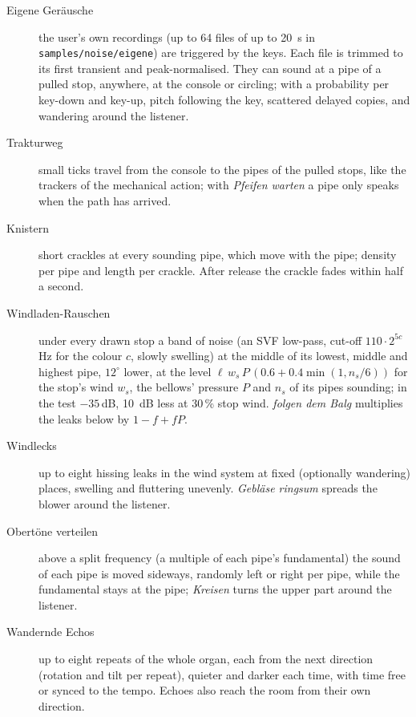 \documentclass[11pt,a4paper,parskip=half,DIV=11,toc=bibliography]{scrartcl}
\newcommand{\ui}[1]{\emph{#1}}                 %
\newcommand{\fn}[1]{\mbox{\texttt{#1}}}
\begin{document}
\begin{description}
  \item[Eigene Geräusche] the user's own recordings (up to 64 files of up to \SI{20}{s} in
        \fn{samples/noise/eigene}) are triggered by the keys. Each file is trimmed to its first
        transient and peak-normalised. They can sound at a pipe of a pulled stop, anywhere, at the
        console or circling; with a probability per key-down and key-up, pitch following the key,
        scattered delayed copies, and wandering around the listener.
  \item[Trakturweg] small ticks travel from the console to the pipes of the pulled stops, like the
        trackers of the mechanical action; with \ui{Pfeifen warten} a pipe only speaks when the path has
        arrived.
  \item[Knistern] short crackles at every sounding pipe, which move with the pipe; density per pipe
        and length per crackle. After release the crackle fades within half a second.
  \item[Windladen-Rauschen] under every drawn stop a band of noise (an SVF low-pass, cut-off $110 \cdot 2^{5c}$\,Hz for the colour $c$, slowly
        swelling) at the middle of its lowest, middle and highest pipe, $12^\circ$ lower, at the level $\ell\,w_s\,P\,(0.6 + 0.4\min(1, n_s/6))$ for the
        stop's wind $w_s$, the bellows' pressure $P$ and $n_s$ of its pipes sounding; in the test $-35$\,dB, \SI{10}{dB} less at 30\,\% stop wind.
        \ui{folgen dem Balg} multiplies the leaks below by $1 - f + f P$.
  \item[Windlecks] up to eight hissing leaks in the wind system at fixed (optionally wandering) places,
        swelling and fluttering unevenly. \ui{Gebläse ringsum} spreads the blower around the listener.
  \item[Obertöne verteilen] above a split frequency (a multiple of each pipe's fundamental) the
        sound of each pipe is moved sideways, randomly left or right per pipe, while the fundamental stays
        at the pipe; \ui{Kreisen} turns the upper part around the listener.
  \item[Wandernde Echos] up to eight repeats of the whole organ, each from the next direction
        (rotation and tilt per repeat), quieter and darker each time, with time free or synced to the
        tempo. Echoes also reach the room from their own direction.
\end{description}
\end{document}
